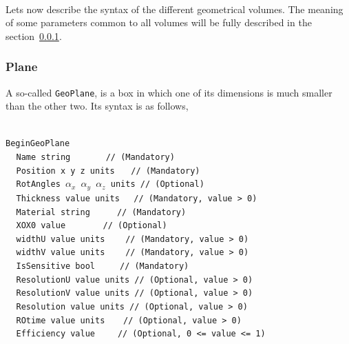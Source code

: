 ~\\
Lets now describe the syntax of the different geometrical volumes. The meaning of some parameters common to all
volumes will be fully described in the section~\ref{subsubsec:Plane}.

\subsubsection{Plane}
\label{subsubsec:Plane}

A so-called {\tt GeoPlane}, is a box in which one of its dimensions is much smaller than the other two. Its 
syntax is as follows,

~\\
\noindent
{\tt BeginGeoPlane} \\
$~~~~~${\tt Name             string                   $~~~~~~~~~~~~$   // (Mandatory)} \\
$~~~~~${\tt Position         x  y  z units                     $~~~$   // (Mandatory)} \\
$~~~~~${\tt RotAngles        $\alpha_x$  $\alpha_y$  $\alpha_z$ units  // (Optional)}  \\
$~~~~~${\tt Thickness        value  units                       $~~$   // (Mandatory, value > 0)} \\
$~~~~~${\tt Material         string                       $~~~~~~~~$   // (Mandatory)} \\
$~~~~~${\tt XOX0             value                   $~~~~~~~~~~~~~$   // (Optional)}  \\
$~~~~~${\tt widthU           value units                     $~~~~~$   // (Mandatory, value > 0)} \\
$~~~~~${\tt widthV           value units                     $~~~~~$   // (Mandatory, value > 0)} \\
$~~~~~${\tt IsSensitive      bool                          $~~~~~~~$   // (Mandatory)} \\
$~~~~~${\tt ResolutionU      value units                               // (Optional, value > 0)} \\
$~~~~~${\tt ResolutionV      value units                               // (Optional, value > 0)} \\
$~~~~~${\tt Resolution       value units                               // (Optional, value > 0)} \\
$~~~~~${\tt ROtime           value units                      $~~~~$   // (Optional, value > 0)} \\
$~~~~~${\tt Efficiency       value                          $~~~~~~$   // (Optional, 0 <= value <= 1)} \\
